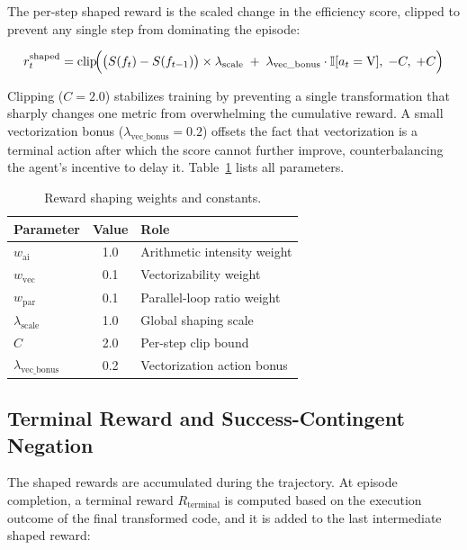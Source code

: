 The per-step shaped reward is the scaled change in the efficiency score, clipped to prevent any single step from dominating the episode:

\begin{equation}
    r_t^\text{shaped} = \text{clip}\!\Bigl( \bigl(S(f_t) - S(f_{t-1})\bigr) \times \lambda_\text{scale} \;+\; \lambda_\text{vec\_bonus} \cdot \mathbb{I}[a_t = \text{V}],\; -C,\; +C \Bigr)
    \label{eq:per-step-reward}
\end{equation}

Clipping ($C = 2.0$) stabilizes training by preventing a single transformation that sharply changes one metric from overwhelming the cumulative reward. A small vectorization bonus ($\lambda_\text{vec\_bonus} = 0.2$) offsets the fact that vectorization is a terminal action after which the score cannot further improve, counterbalancing the agent's incentive to delay it. Table~\ref{tab:reward-weights} lists all parameters.

\begin{table}[H]
    \centering
    \caption{Reward shaping weights and constants.}
    \label{tab:reward-weights}
    \vspace{0.2cm}
    \begin{tabular}{l c p{5cm}}
        \toprule
        \textbf{Parameter} & \textbf{Value} & \textbf{Role} \\
        \midrule
        $w_\text{ai}$ & 1.0 & Arithmetic intensity weight \\
        $w_\text{vec}$ & 0.1 & Vectorizability weight \\
        $w_\text{par}$ & 0.1 & Parallel-loop ratio weight \\
        $\lambda_\text{scale}$ & 1.0 & Global shaping scale \\
        $C$ & 2.0 & Per-step clip bound \\
        $\lambda_\text{vec\_bonus}$ & 0.2 & Vectorization action bonus \\
        \bottomrule
    \end{tabular}
\end{table}

\subsection{Terminal Reward and Success-Contingent Negation}

The shaped rewards are accumulated during the trajectory. At episode completion, a terminal reward $R_\text{terminal}$ is computed based on the execution outcome of the final transformed code, and it is added to the last intermediate shaped reward:

